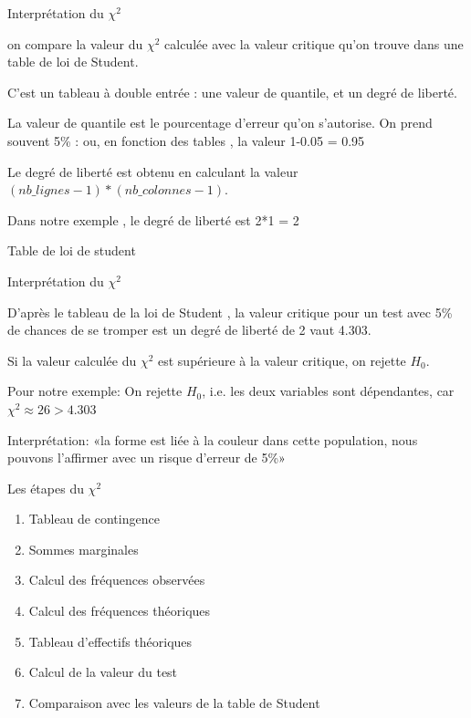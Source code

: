 \documentclass{beamer}
\begin{document}
\begin{frame}{ Interprétation du $\chi^2$ }

on compare la valeur du $\chi^2$ calculée avec la \alert{valeur critique} qu'on trouve   dans une \alert{table de loi de Student}.

C'est un tableau à double entrée : une \alert{valeur de quantile}, et un \alert{degré de liberté}.

La valeur de quantile est le pourcentage d'erreur qu'on s'autorise.  On prend souvent \alert{5\%} : ou, en fonction des tables , la valeur 1-0.05 =  0.95

Le degré de liberté est obtenu en calculant la valeur $(nb\_lignes - 1)*(nb\_colonnes -1)$.


\begin{tiny}
Dans notre exemple , le degré de liberté est 2*1 = 2
\end{tiny}

\end{frame}


\begin{frame}{Table de loi de student}



\end{frame}


\begin{frame}{Interprétation du $\chi^2$}


D'après le tableau de la loi de Student , la valeur critique pour un test avec 5\% de chances de se tromper est un degré de liberté de 2 vaut 4.303.

Si la valeur calculée du $\chi^2$ est \alert{supérieure} à la valeur critique, on \alert{rejette} $H_0$.



Pour notre exemple: On rejette $H_0$, i.e. les deux variables sont \alert{dépendantes},  car $\chi ^2 \approx 26 > 4.303$

Interprétation: «la forme est liée à la couleur dans cette population, nous pouvons l'affirmer avec un risque d'erreur de  5\%»

\end{frame}


\begin{frame}{Les étapes du $\chi ^2$}

\begin{enumerate}
\item Tableau de contingence
\item Sommes marginales 
\item Calcul des fréquences observées 
\item Calcul des fréquences théoriques
\item Tableau d'effectifs théoriques
\item Calcul de la valeur du test 
\item Comparaison avec les valeurs de la table de Student 
\end{enumerate}

\end{frame}
\end{document}
